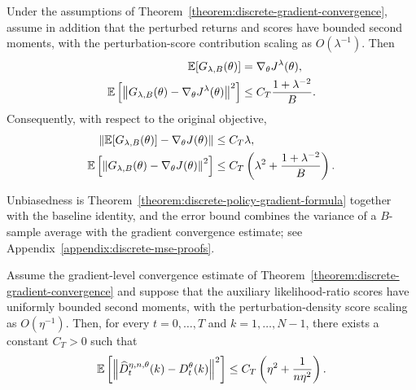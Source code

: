 \begin{proposition}
    \label{prop:oracle-mse-decomposition}
    Under the assumptions of Theorem~\ref{theorem:discrete-gradient-convergence}, assume in addition that the perturbed returns and scores have bounded second moments, with the perturbation-score contribution scaling as $O(\lambda^{-1})$. Then
    \begin{align}
        \mathbb{E}[G_{\lambda,B}(\theta)]
        &=
        \nabla_\theta J^\lambda(\theta),\\
        \mathbb{E}\left[
            \left\|
                G_{\lambda,B}(\theta)
                -
                \nabla_\theta J^\lambda(\theta)
            \right\|^2
        \right]
        &\leq
        C_T\frac{1+\lambda^{-2}}{B}.
    \end{align}
    Consequently, with respect to the original objective,
    \begin{align}
        \left\|
            \mathbb{E}[G_{\lambda,B}(\theta)]
            -
            \nabla_\theta J(\theta)
        \right\|
        &\leq C_T\lambda,\\
        \mathbb{E}\left[
            \left\|
                G_{\lambda,B}(\theta)
                -
                \nabla_\theta J(\theta)
            \right\|^2
        \right]
        &\leq
        C_T\left(
            \lambda^2
            +
            \frac{1+\lambda^{-2}}{B}
        \right).
    \end{align}
\end{proposition}

Unbiasedness is Theorem~\ref{theorem:discrete-policy-gradient-formula} together with the baseline identity, and the error bound combines the variance of a $B$-sample average with the gradient convergence estimate; see Appendix~\ref{appendix:discrete-mse-proofs}.

\begin{proposition}
    \label{prop:auxiliary-sensitivity-error}
    Assume the gradient-level convergence estimate of Theorem~\ref{theorem:discrete-gradient-convergence} and suppose that the auxiliary likelihood-ratio scores have uniformly bounded second moments, with the perturbation-density score scaling as $O(\eta^{-1})$. Then, for every $t=0,\ldots,T$ and $k=1,\ldots,N-1$, there exists a constant $C_T>0$ such that
    \begin{align}
        \mathbb{E}\left[
            \left\|
                \widehat D_t^{\eta,n,\theta}(k)-D_t^\theta(k)
            \right\|^2
        \right]
        \leq
        C_T\left(\eta^2+\frac1{n\eta^2}\right).
    \end{align}
\end{proposition}

